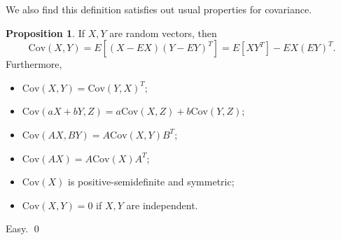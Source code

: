 \documentclass[
]{article}
\theoremstyle{definition}
\newtheorem{prop}{Proposition}
\theoremstyle{definition}
\begin{document}
We also find this definition satisfies out usual properties for
covariance.

\begin{prop}
  If \(X, Y\) are random vectors, then 
  \[\text{Cov}(X, Y) = E[(X - EX)(Y - EY)^T] = E[XY^T] - EX (EY)^T.\]
  Furthermore, 
  \begin{itemize}
    \item \(\text{Cov}(X, Y) = \text{Cov}(Y, X)^T\);
    \item \(\text{Cov}(aX + bY, Z) = a\text{Cov}(X, Z) + b\text{Cov}(Y, Z)\);
    \item \(\text{Cov}(AX, BY) = A\text{Cov}(X, Y)B^T\);
    \item \(\text{Cov}(AX) = A\text{Cov}(X)A^T\);
    \item \(\text{Cov}(X)\) is positive-semidefinite and symmetric;
    \item \(\text{Cov}(X, Y) = 0\) if \(X, Y\) are independent.
  \end{itemize}
\end{prop}
\proof

Easy. \qed
\end{document}
